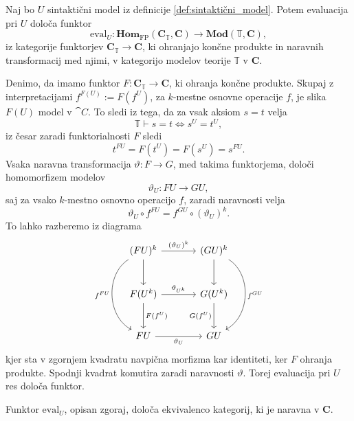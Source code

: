 \documentclass[../kategoricna_logika.tex]{subfiles}
\begin{document}
%
\begin{trditev}
  Naj bo $U$ sintaktični model iz definicije \ref{def:sintaktični_model}. Potem evaluacija pri $U$
  določa funktor
  \[ \mathrm{eval}_U : \mathbf{Hom}_{\mathrm{FP}}(\mathbf{C}_{\mathbb{T}}, \mathbf{C})
    \to \mathbf{Mod}(\mathbb{T}, \mathbf{C}), \]
  iz kategorije funktorjev $\mathbf{C}_{\mathbb{T}} \to \mathbf{C}$,
  ki ohranjajo končne produkte in naravnih transformacij med njimi,
  v kategorijo modelov teorije $\mathbb{T}$ v $\mathbf{C}$.
\end{trditev}
\begin{dokaz}
Denimo, da imamo funktor $F : \mathbf{C}_{\mathbb{T}} \to \mathbf{C}$,
ki ohranja končne produkte.
Skupaj z interpretacijami $f^{F(U)} := F(f^U)$, za $k$-mestne osnovne operacije $f$,
je slika $F(U)$ model v $\cat{C}$.
To sledi iz tega, da za vsak aksiom $s = t$ velja
$$\mathbb{T} \vdash s = t  \iff  s^U = t^U,$$
iz česar zaradi funktorialnosti $F$ sledi
$$t^{FU} = F(t^U) = F(s^U) = s^{FU}.$$
%
Vsaka naravna transformacija $\vartheta : F \to G$, med takima
funktorjema, določi homomorfizem modelov
$$\vartheta_U : FU \to GU,$$
%
saj za vsako $k$-mestno osnovno operacijo $f$, zaradi naravnosti velja
$$\vartheta_U \circ f^{FU} = f^{GU} \circ (\vartheta_U)^k.$$
To lahko razberemo iz diagrama
\[
  \begin{tikzcd}[column sep = large, row sep = large]
    (FU)^k \ar[d] \ar[r, "(\vartheta_U)^k"] \ar[dd, bend right=60, "f^{FU}"'] &
    (GU)^k \ar[d] \ar[dd, bend left = 60, "f^{GU}"] \\
    F(U^k) \ar[d, "F(f^U)"] \ar[r, "\vartheta_{U^k}"] &
    G(U^k) \ar[d, "G(f^U)"'] \\
    FU \ar[r, "\vartheta_U"'] & GU
  \end{tikzcd}
\]
kjer sta v zgornjem kvadratu navpična morfizma kar identiteti,
ker $F$ ohranja produkte.
Spodnji kvadrat komutira zaradi naravnosti $\vartheta$.
Torej evaluacija pri $U$ res določa funktor.
\end{dokaz}
\begin{trditev}\label{trditev:modeli-so-funktorji}
  Funktor $\mathrm{eval}_U$, opisan zgoraj, določa ekvivalenco kategorij,
  ki je naravna v $\mathbf{C}$.
\end{trditev}
\end{document}

